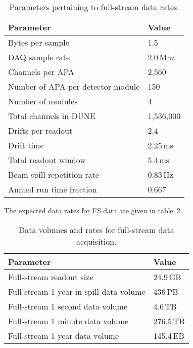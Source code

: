 \documentclass[pdftex,12pt,letter]{article}
\begin{document}
\begin{table}[ht!]
	\centering
	\begin{tabular}{| p{3in} | p{1.1in} |}
		\hline

	\textbf{Parameter} & \textbf{Value} \\ \hline
	
	Bytes per sample & 1.5 \\ \hline
	
	DAQ sample rate & 2.0\,Mhz \\ \hline
	
	Channels per APA & 2,560 \\ \hline
	
	Number of APA per detector module & 150 \\ \hline
	
	Number of modules & 4 \\ \hline
	
	Total channels in DUNE & 1,536,000 \\ \hline \hline
	
	Drifts per readout & 2.4 \\ \hline
	
	Drift time & 2.25\,ms \\ \hline

	Total readout window & 5.4\,ms \\ \hline \hline
	
	Beam spill repetition rate & 0.83\,Hz \\ \hline
	
	Annual run time fraction & 0.667 \\ \hline
	\end{tabular}
	\caption{Parameters pertaining to full-stream data rates.}
	\label{tab:full-stream-parameters}
\end{table}
The expected data rates for FS data are given
in table~\ref{tab:full-stream-volume}.
\begin{table}[ht!]
	\centering
	\begin{tabular}{| p{3in} | p{1.1in} |}
		\hline	
	
	\textbf{Parameter} & \textbf{Value} \\ \hline
	Full-stream readout size & 24.9\,GB \\ \hline
	Full-stream 1 year in-spill data volume & 436\,PB \\ \hline
	Full-stream 1 second data volume & 4.6\,TB \\
	Full-stream 1 minute data volume & 276.5\,TB \\	\hline
	Full-stream 1 year data volume & 145.4\,EB \\ \hline
	\end{tabular}
	\caption{Data volumes and rates for full-stream data acquisition.}
	\label{tab:full-stream-volume}
\end{table}
\end{document}
